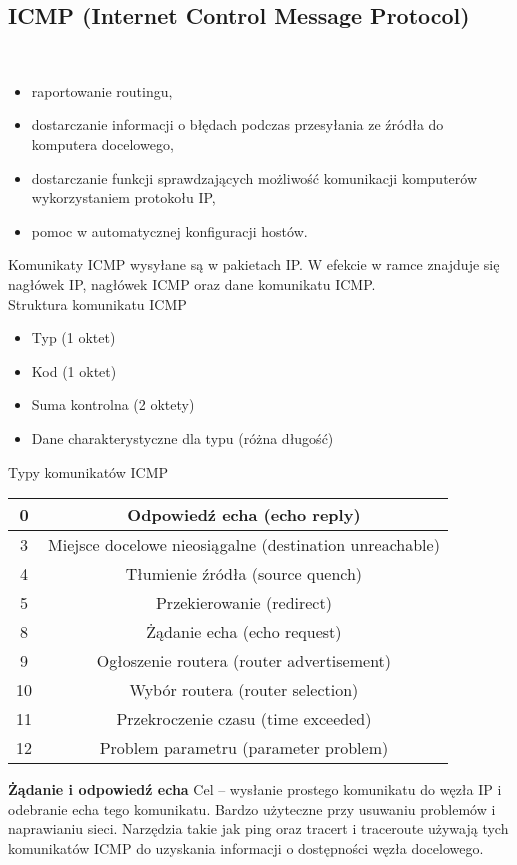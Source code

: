 \documentclass[a4paper]{article}
\begin{document}
\subsection{ICMP (Internet Control Message Protocol)}\
\begin{itemize}
    \item raportowanie routingu,
    \item dostarczanie informacji o błędach podczas przesyłania ze źródła do komputera docelowego,
    \item dostarczanie funkcji sprawdzających możliwość komunikacji komputerów wykorzystaniem protokołu IP,
    \item pomoc w automatycznej konfiguracji hostów.
\end{itemize}
Komunikaty ICMP wysyłane są w pakietach IP. W efekcie w ramce znajduje się nagłówek IP, nagłówek ICMP oraz dane komunikatu ICMP.\\

Struktura komunikatu ICMP
\begin{itemize}
    \item Typ (1 oktet)
    \item Kod (1 oktet)
    \item Suma kontrolna (2 oktety)
    \item Dane charakterystyczne dla typu (różna długość)
\end{itemize}

Typy komunikatów ICMP
\begin{tabular}{|c|c|}
    \hline
    0 & Odpowiedź echa (echo reply)\\
    \hline
    3 & Miejsce docelowe nieosiągalne (destination unreachable)\\
    \hline
    4 & Tłumienie źródła (source quench)\\
    \hline
    5 & Przekierowanie (redirect)\\
    \hline
    8 & Żądanie echa (echo request)\\
    \hline
    9 & Ogłoszenie routera (router advertisement)\\
    \hline
    10 & Wybór routera (router selection)\\
    \hline
    11 & Przekroczenie czasu (time exceeded)\\
    \hline
    12 & Problem parametru (parameter problem)\\
    \hline
\end{tabular}

\textbf{Żądanie i odpowiedź echa}
Cel – wysłanie prostego komunikatu do węzła IP i odebranie echa tego komunikatu. Bardzo
użyteczne przy usuwaniu problemów i naprawianiu sieci. Narzędzia takie jak ping oraz tracert i traceroute używają tych komunikatów ICMP do
uzyskania informacji o dostępności węzła docelowego.\\
\end{document}
